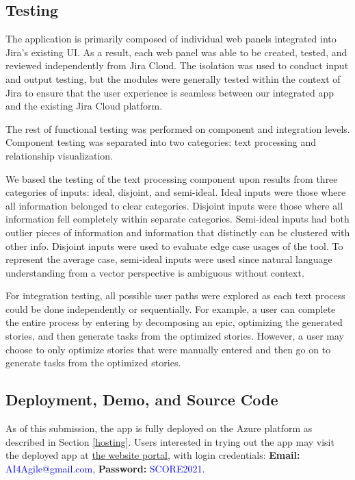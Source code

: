 \subsection{Testing}

The application is primarily composed of individual web panels integrated into Jira’s existing UI. As a result, each web panel was able to be created, tested, and reviewed independently from Jira Cloud. The isolation was used to conduct input and output testing, but the modules were generally tested within the context of Jira to ensure that the user experience is seamless between our integrated app and the existing Jira Cloud platform.

The rest of functional testing was performed on component and integration levels. Component testing was separated into two categories: text processing and relationship visualization.

We based the testing of the text processing component upon results from three categories of inputs: ideal, disjoint, and semi-ideal. Ideal inputs were those where all information belonged to clear categories. Disjoint inputs were those where all information fell completely within separate categories. Semi-ideal inputs had both outlier pieces of information and information that distinctly can be clustered with other info. Disjoint inputs were used to evaluate edge case usages of the tool. To represent the average case, semi-ideal inputs were used since natural language understanding from a vector perspective is ambiguous without context.

For integration testing, all possible user paths were explored as each text process could be done independently or sequentially. For example, a user can complete the entire process by entering by decomposing an epic, optimizing the generated stories, and then generate tasks from the optimized stories. However, a user may choose to only optimize stories that were manually entered and then go on to generate tasks from the optimized stories. 

\subsection{Deployment, Demo, and Source Code}
\label{instructions}
As of this submission, the app is fully deployed on the Azure platform as described in Section \ref{hosting}. Users interested in trying out the app may visit the deployed app at \href{https://id.atlassian.com/login?continue=https\%3A\%2F\%2Fai4agile.atlassian.net\%2Flogin\%3FredirectCount\%3D1\%26application\%3Djira\&application=jira}{the website portal}, with login credentials: \textbf{Email:} \textcolor{blue}{AI4Agile@gmail.com}, \textbf{Password:} \textcolor{blue}{SCORE2021}.

